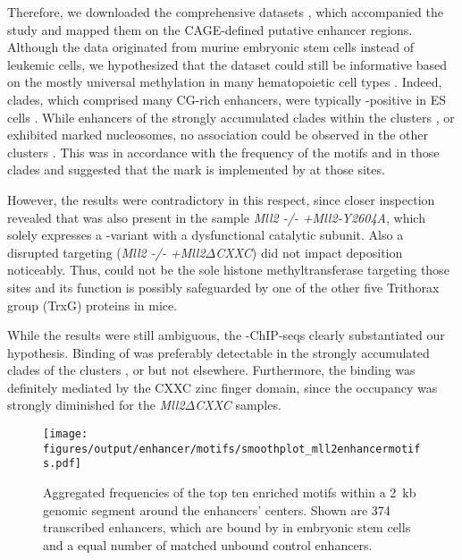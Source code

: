 Therefore, we downloaded the comprehensive datasets , which accompanied the study\cite{Hu2017} and mapped them on the CAGE-defined putative enhancer regions. Although the data originated from murine embryonic stem cells instead of \mllafnine leukemic cells, we hypothesized that the dataset could still be informative based on the mostly universal \hisfourthree methylation in many hematopoietic cell types . Indeed, clades, which comprised many CG-rich \motifmlltwo enhancers, were typically \hisfourthree-positive in ES cells . While enhancers of the strongly accumulated clades within the clusters \amitthree, \amitfour or \amitseven exhibited \hisfourthree marked nucleosomes, no association could be observed in the other clusters \dns. This was in accordance with the frequency of the motifs \motifmlltwo and \motifmlltwoc in those clades and suggested that the mark is implemented by  at those sites. 

However, the results were contradictory in this respect, since closer inspection revealed that \hisfourthree was also present in the sample \textsl{Mll2 -/- +Mll2-Y2604A}, which solely expresses a -variant with a dysfunctional catalytic subunit. Also a disrupted targeting (\textsl{Mll2 -/- +Mll2$\Delta$CXXC}) did not impact \hisfourthree deposition noticeably. Thus,  could not be the sole histone methyltransferase targeting those sites and its function is possibly safeguarded by one of the other five Trithorax group (TrxG) proteins in mice\cite{Piunti2016}. 

While the \hisfourthree results were still ambiguous, the -ChIP-seqs clearly substantiated our hypothesis. Binding of  was preferably detectable in the strongly accumulated clades of the clusters \amitthree, \amitfour or \amitseven but not elsewhere. Furthermore, the binding was definitely mediated by the CXXC zinc finger domain, since the occupancy was strongly diminished for the \textsl{Mll2$\Delta$CXXC} samples. 

\begin{figure}[!h]
	\centering
	\texttt{[image: figures/output/enhancer/motifs/smoothplot\_mll2enhancermotifs.pdf]} 
	\caption{Aggregated frequencies of the top ten enriched motifs within a \SI{2}{\kilo b} genomic segment around the enhancers' centers. Shown are \num{374} transcribed enhancers, which are bound by  in embryonic stem cells and a equal number of matched unbound control enhancers.}
	\label{fig:enhancers:motifs:smoothplot_mll2enhancermotifs}
\end{figure}

